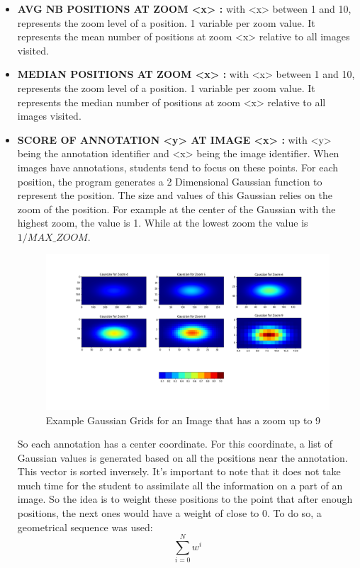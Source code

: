 \documentclass[a4paper,11pt]{report}
\numberwithin{figure}{section} %
\begin{document}
\begin{itemize}
    \item[\textbullet] \textbf{AVG NB POSITIONS AT ZOOM <x> :} with <x> between 1 and 10, represents the zoom level of a position.
    1 variable per zoom value.
    It represents the mean number of positions at zoom <x> relative to all images visited.\\
    \item[\textbullet] \textbf{MEDIAN POSITIONS AT ZOOM <x> :} with <x> between 1 and 10, represents the zoom level of a position.
    1 variable per zoom value.
    It represents the median number of positions at zoom <x> relative to all images visited.\\
    \item[\textbullet] \label{enum:score} \textbf{SCORE OF ANNOTATION <y> AT IMAGE <x> :} with <y> being the annotation identifier and <x> being the image identifier.
    When images have annotations, students tend to focus on these points.
    For each position, the program generates a 2 Dimensional Gaussian function to represent the position.
    The size and values of this Gaussian relies on the zoom of the position.
    For example at the center of the Gaussian with the highest zoom, the value is 1.
    While at the lowest zoom the value is $1/MAX\_ZOOM$.
    \begin{figure}[H]
\begin{center}
\includegraphics[scale=0.35]{plots/gaussian.png}
\caption{Example Gaussian Grids for an Image that has a zoom up to 9}
\end{center}
\end{figure}

   So each annotation has a center coordinate.
   For this coordinate, a list of Gaussian values is generated based on all the positions near the annotation.
   This vector is sorted inversely.
   It's important to note that it does not take much time for the student to assimilate all the information on a part of an image.
   So the idea is to weight these positions to the point that after enough positions, the next ones would have a weight of close to 0.
To do so, a geometrical sequence was used:
	\[\sum\limits_{i=0}^N w^i\]


\end{itemize}
\end{document}
